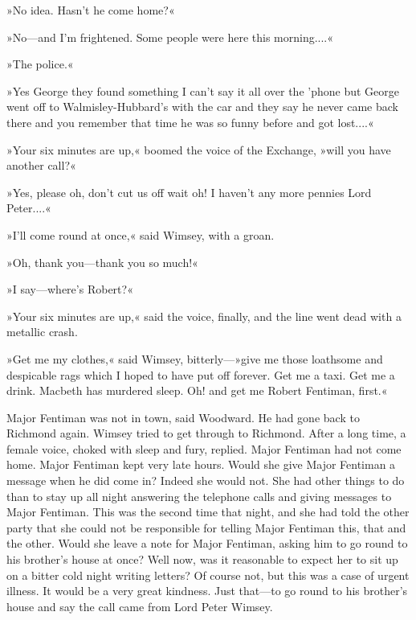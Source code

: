 »No idea. Hasn't he come home?«

»No—and I'm frightened. Some people were here this morning....«

»The police.«

»Yes \textellipsis  George \textellipsis  they found something \textellipsis  I can't say it all over the 'phone \textellipsis  but George went off to Walmisley-Hubbard's with the car \textellipsis  and they say he never came back there \textellipsis  and \textellipsis  you remember that time he was so funny before \textellipsis  and got lost....«

»Your six minutes are up,« boomed the voice of the Exchange, »will you have another call?«

»Yes, please \textellipsis  oh, don't cut us off \textellipsis  wait \textellipsis  oh! I haven't any more pennies \textellipsis  Lord Peter....«

»I'll come round at once,« said Wimsey, with a groan.

»Oh, thank you—thank you so much!«

»I say—where's Robert?«

»Your six minutes are up,« said the voice, finally, and the line went dead with a metallic crash.

»Get me my clothes,« said Wimsey, bitterly—»give me those loathsome and despicable rags which I hoped to have put off forever. Get me a taxi. Get me a drink. Macbeth has murdered sleep. Oh! and get me Robert Fentiman, first.«

Major Fentiman was not in town, said Woodward. He had gone back to Richmond again. Wimsey tried to get through to Richmond. After a long time, a female voice, choked with sleep and fury, replied. Major Fentiman had not come home. Major Fentiman kept very late hours. Would she give Major Fentiman a message when he did come in? Indeed she would not. She had other things to do than to stay up all night answering the telephone calls and giving messages to Major Fentiman. This was the second time that night, and she had told the other party that she could not be responsible for telling Major Fentiman this, that and the other. Would she leave a note for Major Fentiman, asking him to go round to his brother's house at once? Well now, was it reasonable to expect her to sit up on a bitter cold night writing letters? Of course not, but this was a case of urgent illness. It would be a very great kindness. Just that—to go round to his brother's house and say the call came from Lord Peter Wimsey.

